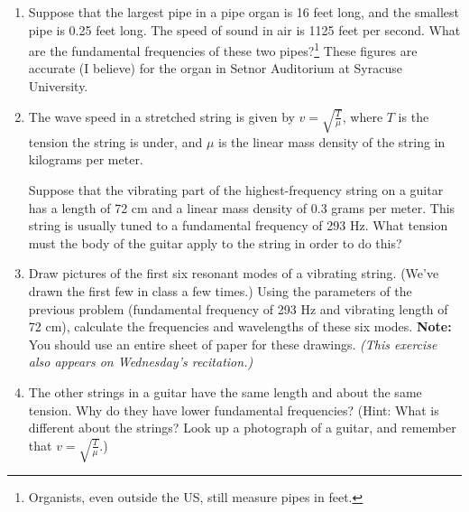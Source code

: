 \documentclass[12pt]{article}
\begin{document}
\Large
\centerline{}
\normalsize
\centerline{}


\begin{enumerate}

\item Suppose that the largest pipe in a pipe organ is 16 feet long, and the smallest pipe is 0.25 feet long. The speed of sound in air is 1125 feet per second. What 
are the fundamental frequencies of these two pipes?\footnote{Organists, even outside the US, still measure pipes in feet.} These figures are accurate (I believe) for the organ in Setnor Auditorium at Syracuse University.
%

\item The wave speed in a stretched string is given by $v=\sqrt{\frac{T}{\mu}}$, where $T$ is the tension the string is under, and $\mu$ is the linear mass density of the string in kilograms per meter. 

Suppose that the vibrating part of the highest-frequency string on a guitar has a length of 72 cm and a linear mass density of 0.3 grams per meter. This string is usually tuned to a fundamental frequency of 293 Hz. What tension must the body of the guitar apply to the string in order to do this?

\item Draw pictures of the first six resonant modes of a vibrating string. (We've drawn the first few in class a few times.) Using the parameters of the previous problem (fundamental frequency of 293 Hz and vibrating length of 72 cm), calculate the frequencies and wavelengths of these six modes. {\bf Note:} You should use an entire sheet of paper for these drawings. {\it (This exercise also appears on Wednesday's recitation.)}

\item The other strings in a guitar have the same length and about the same tension. Why do they have lower fundamental frequencies? (Hint: What is different about the strings? Look up a photograph of a guitar, and remember that $v=\sqrt{\frac{T}{\mu}}$.) 


\end{enumerate}
\end{document}

